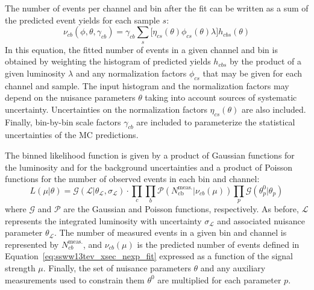 The number of events per channel and bin after the fit can be written as a sum of the predicted event yields for each sample $s$:
\begin{equation}
  \nu_{cb}(\phi,\theta,\gamma_{cb}) = \gamma_{cb}\sum\limits_{s}\big[\eta_{cs}(\theta)\phi_{cs}(\theta)\lambda\big] h_{cbs}(\theta)
  \label{eq:ssww13tev_xsec_nexp_fit}
\end{equation}
In this equation, the fitted number of events in a given channel and bin is obtained by weighting the histogram of predicted yields $h_{cbs}$ by the product of a given luminosity $\lambda$ and any normalization factors $\phi_{cs}$ that may be given for each channel and sample.
The input histogram and the normalization factors may depend on the nuisance parameters $\theta$ taking into account sources of systematic uncertainty.
Uncertainties on the normalization factors $\eta_{cs}(\theta)$ are also included.
Finally, bin-by-bin scale factors $\gamma_{cb}$ are included to parameterize the statistical uncertainties of the MC predictions.

The binned likelihood function is given by a product of Gaussian functions for the luminosity and for the background uncertainties and a product of Poisson functions for the number of observed events in each bin and channel:
\begin{equation}
  L(\mu|\theta) = \mathcal{G}(\mathcal{L}|\theta_{\mathcal{L}},\sigma_{\mathcal{L}})\cdot \prod\limits_{c}\prod\limits_{b}\mathcal{P}(N_{\textrm{cb}}^{\textrm{meas.}}|\nu_{cb}(\mu))\prod\limits_{p}\mathcal{G}(\theta_{p}^{0}|\theta_{p})
\end{equation}
where $\mathcal{G}$ and $\mathcal{P}$ are the Gaussian and Poisson functions, respectively.
As before, $\mathcal{L}$ represents the integrated luminosity with uncertainty $\sigma_{\mathcal{L}}$ and associated nuisance parameter $\theta_{\mathcal{L}}$.
The number of measured events in a given bin and channel is represented by $N_{cb}^{\textrm{meas.}}$, and $\nu_{cb}(\mu)$ is the predicted number of events defined in Equation~\ref{eq:ssww13tev_xsec_nexp_fit} expressed as a function of the signal strength $\mu$.
Finally, the set of nuisance parameters $\theta$ and any auxiliary measurements used to constrain them $\theta^0$ are multiplied for each parameter $p$.

